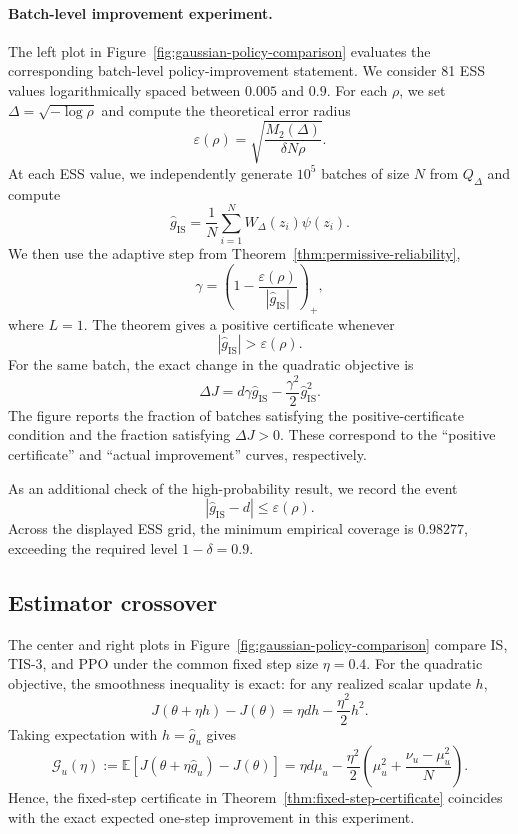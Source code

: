 \documentclass[11pt]{article}
\theoremstyle{remark}
\newcommand{\E}{\mathbb{E}}
\begin{document}
\paragraph{Batch-level improvement experiment.}
The left plot in Figure~\ref{fig:gaussian-policy-comparison} evaluates the corresponding batch-level policy-improvement statement. We consider 81 ESS values logarithmically spaced between $0.005$ and $0.9$. For each $\rho$, we set $\Delta=\sqrt{-\log\rho}$ and compute the theoretical error radius
\[
\varepsilon(\rho)
=
\sqrt{\frac{M_2(\Delta)}{\delta N\rho}}.
\]
At each ESS value, we independently generate $10^5$ batches of size $N$ from $Q_\Delta$ and compute
\[
\widehat g_{\mathrm{IS}}
=
\frac1N\sum_{i=1}^N W_\Delta(z_i)\psi(z_i).
\]
We then use the adaptive step from Theorem~\ref{thm:permissive-reliability},
\[
\gamma
=
\left(1-\frac{\varepsilon(\rho)}{|\widehat g_{\mathrm{IS}}|}\right)_+,
\]
where $L=1$. The theorem gives a positive certificate whenever
\[
|\widehat g_{\mathrm{IS}}|>\varepsilon(\rho).
\]
For the same batch, the exact change in the quadratic objective is
\[
\Delta J
=
d\gamma\widehat g_{\mathrm{IS}}
-
\frac{\gamma^2}{2}\widehat g_{\mathrm{IS}}^2.
\]
The figure reports the fraction of batches satisfying the positive-certificate condition and the fraction satisfying $\Delta J>0$. These correspond to the ``positive certificate'' and ``actual improvement'' curves, respectively.

As an additional check of the high-probability result, we record the event
\[
|\widehat g_{\mathrm{IS}}-d|\le\varepsilon(\rho).
\]
Across the displayed ESS grid, the minimum empirical coverage is $0.98277$, exceeding the required level $1-\delta=0.9$.

\subsection{Estimator crossover}

The center and right plots in Figure~\ref{fig:gaussian-policy-comparison} compare IS, TIS-3, and PPO under the common fixed step size $\eta=0.4$. For the quadratic objective, the smoothness inequality is exact: for any realized scalar update $h$,
\[
J(\theta+\eta h)-J(\theta)
=
\eta dh-\frac{\eta^2}{2}h^2.
\]
Taking expectation with $h=\widehat g_u$ gives
\begin{equation}
\mathcal G_u(\eta)
:=
\E[J(\theta+\eta\widehat g_u)-J(\theta)]
=
\eta d\mu_u
-
\frac{\eta^2}{2}
\left(\mu_u^2+\frac{\nu_u-\mu_u^2}{N}\right).
\label{eq:gaussian-exact-gain}
\end{equation}
Hence, the fixed-step certificate in Theorem~\ref{thm:fixed-step-certificate} coincides with the exact expected one-step improvement in this experiment.
\end{document}
